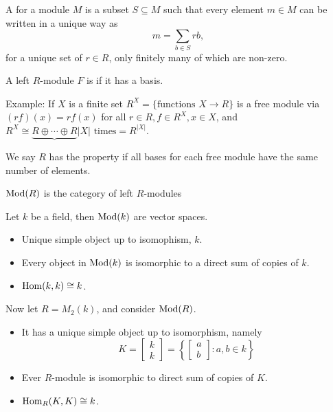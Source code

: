   \begin{define}
    A  for a module $M$ is a subset $S \subseteq M$ such
    that every element $m\in M$ can be written in a unique way as
    \[m = \sum_{b\in S} rb, \]
    for a unique set of $r \in R$, only finitely many of which are non-zero.
  \end{define}

  \begin{define}
    A left $R$-module $F$ is  if it has a basis.
  \end{define}

  Example: If $X$ is a finite set $R^X = \{\text{functions } X\to R\}$ is
  a free module via $(rf)(x) = rf(x)$ for all $r\in R,f\in R^X,x\in X$, and
  $R^X \cong \underbrace{R\oplus\cdots\oplus R}{|X|\text{ times}} = R^{|X|}$.

  \begin{define}
    We say $R$ has the  property if all bases for
    each free module have the same number of elements.
  \end{define}

  $\operatorname{Mod}(R)$ is the category of left $R$-modules

  Let $k$ be a field, then $\operatorname{Mod}(k)$ are vector spaces.
  \begin{itemize}
    \item Unique simple object up to isomophism, $k$.
    \item Every object in $\operatorname{Mod}(k)$ is isomorphic to a direct sum of copies of
      $k$.
    \item $\operatorname{Hom}(k,k) \cong k$.
  \end{itemize}

  Now let $R = M_2(k)$, and consider $\operatorname{Mod}(R)$.
  \begin{itemize}
    \item It has a unique simple object up to isomorphism, namely
    \[ K = \begin{bmatrix} k \\ k \end{bmatrix} = \left\{\begin{bmatrix} a \\ b\end{bmatrix} : a,b\in k\right\} \]
    \item Ever $R$-module is isomorphic to direct sum of copies of $K$.
    \item $\operatorname{Hom}_R(K,K) \cong k$.
  \end{itemize}

